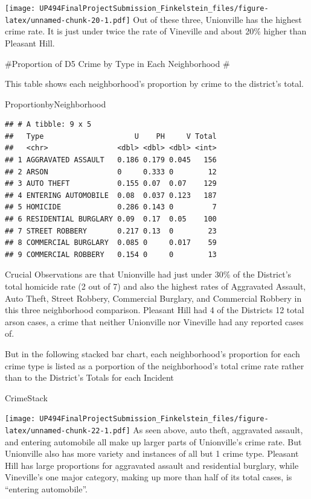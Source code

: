 \documentclass[
]{article}
\newenvironment{Shaded}{\begin{snugshade}}{\end{snugshade}}
\newcommand{\NormalTok}[1]{#1}
\begin{document}
\texttt{[image: UP494FinalProjectSubmission\_Finkelstein\_files/figure-latex/unnamed-chunk-20-1.pdf]}
Out of these three, Unionville has the highest crime rate. It is just
under twice the rate of Vineville and about 20\% higher than Pleasant
Hill.

\#Proportion of D5 Crime by Type in Each Neighborhood \#

This table shows each neighborhood's proportion by crime to the
district's total.

\begin{Shaded}
\begin{Highlighting}[]
\NormalTok{ProportionbyNeighborhood}
\end{Highlighting}
\end{Shaded}

\begin{verbatim}
## # A tibble: 9 x 5
##   Type                     U    PH     V Total
##   <chr>                <dbl> <dbl> <dbl> <int>
## 1 AGGRAVATED ASSAULT   0.186 0.179 0.045   156
## 2 ARSON                0     0.333 0        12
## 3 AUTO THEFT           0.155 0.07  0.07    129
## 4 ENTERING AUTOMOBILE  0.08  0.037 0.123   187
## 5 HOMICIDE             0.286 0.143 0         7
## 6 RESIDENTIAL BURGLARY 0.09  0.17  0.05    100
## 7 STREET ROBBERY       0.217 0.13  0        23
## 8 COMMERCIAL BURGLARY  0.085 0     0.017    59
## 9 COMMERCIAL ROBBERY   0.154 0     0        13
\end{verbatim}

Crucial Observations are that Unionville had just under 30\% of the
District's total homicide rate (2 out of 7) and also the highest rates
of Aggravated Assault, Auto Theft, Street Robbery, Commercial Burglary,
and Commercial Robbery in this three neighborhood comparison. Pleasant
Hill had 4 of the Districts 12 total arson cases, a crime that neither
Unionville nor Vineville had any reported cases of.

But in the following stacked bar chart, each neighborhood's proportion
for each crime type is listed as a porportion of the neighborhood's
total crime rate rather than to the District's Totals for each Incident

\begin{Shaded}
\begin{Highlighting}[]
\NormalTok{CrimeStack}
\end{Highlighting}
\end{Shaded}

\texttt{[image: UP494FinalProjectSubmission\_Finkelstein\_files/figure-latex/unnamed-chunk-22-1.pdf]}
As seen above, auto theft, aggravated assault, and entering automobile
all make up larger parts of Unionville's crime rate. But Unionville also
has more variety and instances of all but 1 crime type. Pleasant Hill
has large proportions for aggravated assault and residential burglary,
while Vineville's one major category, making up more than half of its
total cases, is ``entering automobile''.
\end{document}
